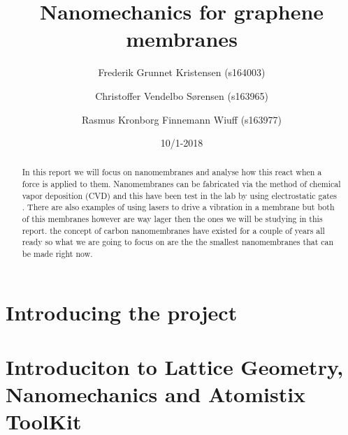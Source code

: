 \documentclass[aps, prl, reprint, a4paper, english, 12pt, twocolumn]{revtex4}
\begin{document}
\begin{abstract}
 \begin{description}
  In this report we will focus on nanomembranes and analyse how this react when a force is applied to them. Nanomembranes can be fabricated via the method of chemical vapor deposition (CVD) and this have been test in the lab by using electrostatic gates \cite{Zande2010}. There are also examples of using lasers to drive a vibration in a membrane \cite{Davidovikj2016} but both of this membranes however are way lager then the ones we will be studying in this report. the concept of carbon nanomembranes have existed for a couple of years all ready so what we are going to focus on are the the smallest nanomembranes that can be made right now.
 \end{description}
\end{abstract}

\title{Nanomechanics for graphene membranes}
\date{10/1-2018}
\author{Frederik Grunnet Kristensen (s164003)}
\author{Christoffer Vendelbo Sørensen (s163965)}
\author{Rasmus Kronborg Finnemann Wiuff (s163977)}

\maketitle


\tableofcontents
\thispagestyle{empty}
\newpage
\setcounter{page}{1}

\section{Introducing the project}

\section{Introduciton to Lattice Geometry, Nanomechanics and Atomistix ToolKit}





\newpage



\newpage
\listoffigures
\listoftables
\listoflistings
\onecolumngrid
\newpage

\end{document}
